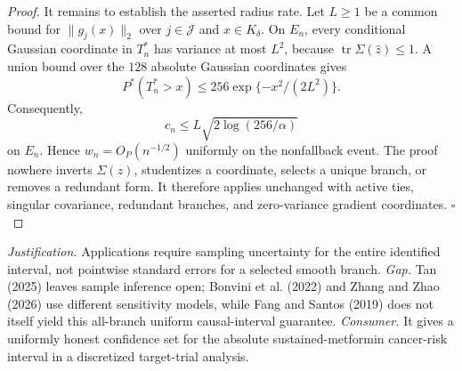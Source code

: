 \documentclass{article}
\begin{document}
\begin{proof}
It remains to establish the asserted radius rate.  Let \(L\geq1\) be a common bound for \(\|g_j(x)\|_2\) over \(j\in\mathcal J\) and \(x\in K_\delta\).  On \(E_n\), every conditional Gaussian coordinate in \(T_n^*\) has variance at most \(L^2\), because \(\operatorname{tr}\Sigma(\widehat z)\leq1\).  A union bound over the \(128\) absolute Gaussian coordinates gives
\[
 P^*(T_n^*>x)\leq256\exp\{-x^2/(2L^2)\}.
\]
Consequently,
\[
 c_n\leq L\sqrt{2\log(256/\alpha)}
\]
on \(E_n\).  Hence \(w_n=O_P(n^{-1/2})\) uniformly on the nonfallback event.  The proof nowhere inverts \(\Sigma(z)\), studentizes a coordinate, selects a unique branch, or removes a redundant form.  It therefore applies unchanged with active ties, singular covariance, redundant branches, and zero-variance gradient coordinates. \(\square\)
\end{proof}
\par\smallskip\noindent \textit{Justification.} Applications require sampling uncertainty for the entire identified interval, not pointwise standard errors for a selected smooth branch. \textit{Gap.} Tan (2025) leaves sample inference open; Bonvini et al. (2022) and Zhang and Zhao (2026) use different sensitivity models, while Fang and Santos (2019) does not itself yield this all-branch uniform causal-interval guarantee. \textit{Consumer.} It gives a uniformly honest confidence set for the absolute sustained-metformin cancer-risk interval in a discretized target-trial analysis.
\end{document}
